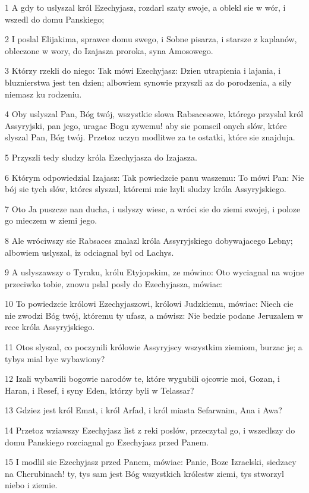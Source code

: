 \par 1 A gdy to uslyszal król Ezechyjasz, rozdarl szaty swoje, a oblekl sie w wór, i wszedl do domu Panskiego;
\par 2 I poslal Elijakima, sprawce domu swego, i Sobne pisarza, i starsze z kaplanów, obleczone w wory, do Izajasza proroka, syna Amosowego.
\par 3 Którzy rzekli do niego: Tak mówi Ezechyjasz: Dzien utrapienia i lajania, i bluznierstwa jest ten dzien; albowiem synowie przyszli az do porodzenia, a sily niemasz ku rodzeniu.
\par 4 Oby uslyszal Pan, Bóg twój, wszystkie slowa Rabsacesowe, którego przyslal król Assyryjski, pan jego, uragac Bogu zywemu! aby sie pomscil onych slów, które slyszal Pan, Bóg twój. Przetoz uczyn modlitwe za te ostatki, które sie znajduja.
\par 5 Przyszli tedy sludzy króla Ezechyjasza do Izajasza.
\par 6 Którym odpowiedzial Izajasz: Tak powiedzcie panu waszemu: To mówi Pan: Nie bój sie tych slów, któres slyszal, któremi mie lzyli sludzy króla Assyryjskiego.
\par 7 Oto Ja puszcze nan ducha, i uslyszy wiesc, a wróci sie do ziemi swojej, i poloze go mieczem w ziemi jego.
\par 8 Ale wróciwszy sie Rabsaces znalazl króla Assyryjskiego dobywajacego Lebny; albowiem uslyszal, iz odciagnal byl od Lachys.
\par 9 A uslyszawszy o Tyraku, królu Etyjopskim, ze mówino: Oto wyciagnal na wojne przeciwko tobie, znowu pslal posly do Ezechyjasza, mówiac:
\par 10 To powiedzcie królowi Ezechyjaszowi, królowi Judzkiemu, mówiac: Niech cie nie zwodzi Bóg twój, któremu ty ufasz, a mówisz: Nie bedzie podane Jeruzalem w rece króla Assyryjskiego.
\par 11 Otos slyszal, co poczynili królowie Assyryjscy wszystkim ziemiom, burzac je; a tybys mial byc wybawiony?
\par 12 Izali wybawili bogowie narodów te, które wygubili ojcowie moi, Gozan, i Haran, i Resef, i syny Eden, którzy byli w Telassar?
\par 13 Gdziez jest król Emat, i król Arfad, i król miasta Sefarwaim, Ana i Awa?
\par 14 Przetoz wziawszy Ezechyjasz list z reki poslów, przeczytal go, i wszedlszy do domu Panskiego rozciagnal go Ezechyjasz przed Panem.
\par 15 I modlil sie Ezechyjasz przed Panem, mówiac: Panie, Boze Izraelski, siedzacy na Cherubinach! ty, tys sam jest Bóg wszystkich królestw ziemi, tys stworzyl niebo i ziemie.
